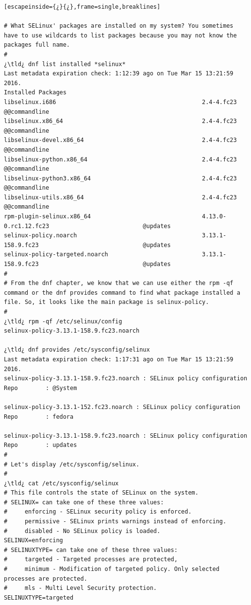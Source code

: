 \begin{lstlisting}[escapeinside={¿}{¿},frame=single,breaklines]

# What SELinux' packages are installed on my system? You sometimes have to use wildcards to list packages because you may not know the packages full name.
#
¿\tld¿ dnf list installed *selinux*
Last metadata expiration check: 1:12:39 ago on Tue Mar 15 13:21:59 2016.
Installed Packages
libselinux.i686                                          2.4-4.fc23                                     @@commandline
libselinux.x86_64                                        2.4-4.fc23                                     @@commandline
libselinux-devel.x86_64                                  2.4-4.fc23                                     @@commandline
libselinux-python.x86_64                                 2.4-4.fc23                                     @@commandline
libselinux-python3.x86_64                                2.4-4.fc23                                     @@commandline
libselinux-utils.x86_64                                  2.4-4.fc23                                     @@commandline
rpm-plugin-selinux.x86_64                                4.13.0-0.rc1.12.fc23                           @updates     
selinux-policy.noarch                                    3.13.1-158.9.fc23                              @updates     
selinux-policy-targeted.noarch                           3.13.1-158.9.fc23                              @updates     
#
# From the dnf chapter, we know that we can use either the rpm -qf command or the dnf provides command to find what package installed a file. So, it looks like the main package is selinux-policy.
#
¿\tld¿ rpm -qf /etc/selinux/config
selinux-policy-3.13.1-158.9.fc23.noarch

¿\tld¿ dnf provides /etc/sysconfig/selinux
Last metadata expiration check: 1:17:31 ago on Tue Mar 15 13:21:59 2016.
selinux-policy-3.13.1-158.9.fc23.noarch : SELinux policy configuration
Repo        : @System

selinux-policy-3.13.1-152.fc23.noarch : SELinux policy configuration
Repo        : fedora

selinux-policy-3.13.1-158.9.fc23.noarch : SELinux policy configuration
Repo        : updates
#
# Let's display /etc/sysconfig/selinux.
#
¿\tld¿ cat /etc/sysconfig/selinux
# This file controls the state of SELinux on the system.
# SELINUX= can take one of these three values:
#     enforcing - SELinux security policy is enforced.
#     permissive - SELinux prints warnings instead of enforcing.
#     disabled - No SELinux policy is loaded.
SELINUX=enforcing
# SELINUXTYPE= can take one of these three values:
#     targeted - Targeted processes are protected,
#     minimum - Modification of targeted policy. Only selected processes are protected. 
#     mls - Multi Level Security protection.
SELINUXTYPE=targeted 


\end{lstlisting}
